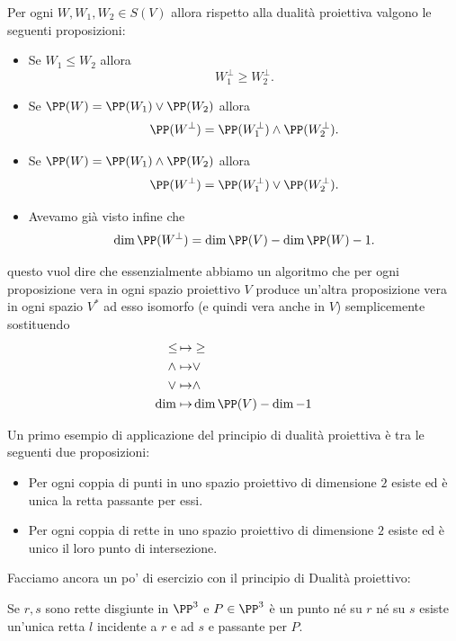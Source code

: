 \documentclass[11pt]{scrartcl}
\begin{document}
   	 \begin{proposition}
   	 	Per ogni $W,W_1,W_2\in S(V)$ allora rispetto alla dualità proiettiva valgono le seguenti proposizioni:
   	 	\begin{itemize}
   	 		\item Se $W_1\le W_2$ allora 
   	 		$$W_1^\perp \ge W_2^\perp.$$
   	 		\item Se $\PP(W)=\PP(W_1)\lor \PP(W_2)$ allora 
   	 		$$\PP(W^\perp)=\PP(W_1^\perp)\land \PP(W_2^\perp).$$
   	 		\item Se $\PP(W)=\PP(W_1)\land \PP(W_2)$ allora
   	 		$$\PP(W^\perp)=\PP(W_1^\perp)\lor \PP(W_2^\perp).$$
   	 		\item Avevamo già visto infine che 
   	 		$$\dim \PP(W^\perp)=\dim \PP(V)-\dim \PP(W)-1.$$
   	 	\end{itemize}
   	 	questo vuol dire che essenzialmente abbiamo un algoritmo che per ogni proposizione vera in ogni spazio proiettivo $V$ produce un'altra proposizione vera in ogni spazio $V^*$ ad esso isomorfo (e quindi vera anche in $V$) semplicemente sostituendo 
   	 	\begin{align*}
   	 		\le\,   \mapsto  & \ge \\
   	 		\land \mapsto  & \lor \\
   	 		\lor  \mapsto  & \land \\
   	 		\dim  \mapsto  & \dim\PP(V)-\dim -1
   	 	\end{align*}
   	 \end{proposition}
   	 \begin{example}
   	 	Un primo esempio di applicazione del principio di dualità proiettiva è tra le seguenti due proposizioni:
   	 	\begin{itemize}
   	 		\item Per ogni coppia di punti in uno spazio proiettivo di dimensione $2$ esiste ed è unica la retta passante per essi.
   	 		\item Per ogni coppia di rette in uno spazio proiettivo di dimensione $2$ esiste ed è unico il loro punto di intersezione. 
   	 	\end{itemize}
   	 \end{example}
   	 Facciamo ancora un po' di esercizio con il principio di Dualità proiettivo:
   	 \begin{proposition}
   	 	\label{Retta per un punto e due rette}
   	 	Se $r,s$ sono rette disgiunte in $\PP^3$ e $P\in \PP^3$ è un punto né su $r$ né su $s$ esiste un'unica retta $l$ incidente a $r$ e ad $s$ e passante per $P$.
   	 \end{proposition}
\end{document}

